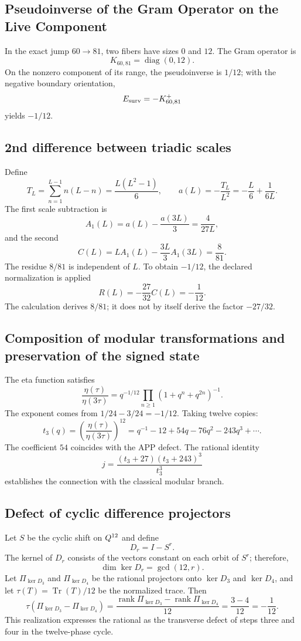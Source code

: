 \subsection{Pseudoinverse of the Gram Operator on the Live Component}

In the exact jump \(60\to81\), two fibers have sizes \(0\) and
\(12\). The Gram operator is
\[
K_{60,81}=\operatorname{diag}(0,12).
\]
On the nonzero component of its range, the pseudoinverse is \(1/12\); with the negative
boundary orientation,
\[
E_{\rm surv}=-K_{60,81}^{+}
\]
yields \(-1/12\).

\subsection{2nd difference between triadic scales}

Define
\[
T_L=\sum_{n=1}^{L-1}n(L-n)=\frac{L(L^2-1)}6,
\qquad
a(L)=-\frac{T_L}{L^2}=-\frac L6+\frac1{6L}.
\]
The first scale subtraction is
\[
A_1(L)=a(L)-\frac{a(3L)}3=\frac4{27L},
\]
and the second
\[
C(L)=LA_1(L)-\frac{3L}{3}A_1(3L)=\frac8{81}.
\]
The residue \(8/81\) is independent of \(L\). To obtain
\(-1/12\), the declared normalization is applied
\[
R(L)=-\frac{27}{32}C(L)=-\frac1{12}.
\]
The calculation derives \(8/81\); it does not by itself derive the factor \(-27/32\).

\subsection{Composition of modular transformations and preservation of the signed state}

The eta function satisfies
\[
\frac{\eta(\tau)}{\eta(3\tau)}
=q^{-1/12}\prod_{n\ge1}(1+q^n+q^{2n})^{-1}.
\]
The exponent comes from \(1/24-3/24=-1/12\). Taking twelve copies:
\[
t_3(q)=\left(\frac{\eta(\tau)}{\eta(3\tau)}\right)^{12}
=q^{-1}-12+54q-76q^2-243q^3+\cdots.
\]
The coefficient \(54\) coincides with the APP defect\@. The rational identity
\[
j=\frac{(t_3+27)(t_3+243)^3}{t_3^3}
\]
establishes the connection with the classical modular branch.

\subsection{Defect of cyclic difference projectors}

Let \(S\) be the cyclic shift on \(Q^{12}\) and define
\[
 D_r=I-S^r.
\]
The kernel of \(D_r\) consists of the vectors constant on each orbit
of \(S^r\); therefore,
\[
 \dim\ker D_r=\gcd(12,r).
\]
Let \(\Pi_{\ker D_3}\) and \(\Pi_{\ker D_4}\) be the rational projectors onto
\(\ker D_3\) and \(\ker D_4\), and let
\(\tau(T)=\operatorname{Tr}(T)/12\) be the normalized trace. Then
\[
 \boxed{
 \tau(\Pi_{\ker D_3}-\Pi_{\ker D_4})
 =\frac{\operatorname{rank}\Pi_{\ker D_3}
       -\operatorname{rank}\Pi_{\ker D_4}}{12}
 =\frac{3-4}{12}
 =-\frac1{12}.}
\]
This realization expresses the rational as the transverse defect of steps
three and four in the twelve-phase cycle.

